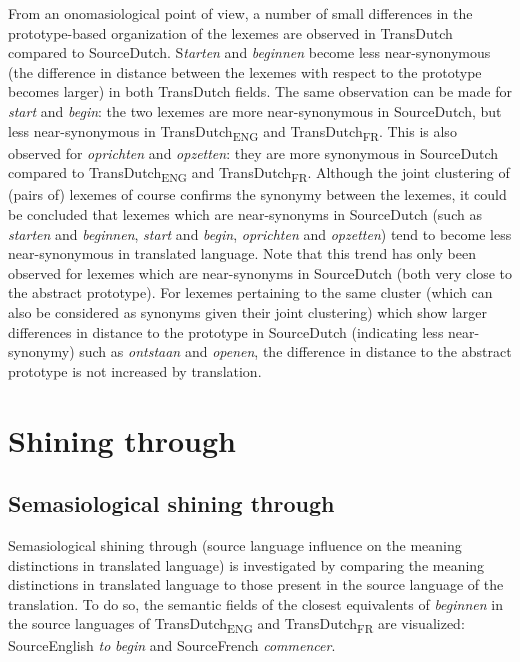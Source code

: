 From an onomasiological point of view, a number of small differences in the prototype-based organization of the lexemes are observed in TransDutch compared to SourceDutch. S\textit{tarten} and \textit{beginnen} become less near-synonymous (the difference in distance between the lexemes with respect to the prototype becomes larger) in both TransDutch fields. The same observation can be made for \textit{start} and \textit{begin}: the two lexemes are more near-synonymous in SourceDutch, but less near-synonymous in TransDutch\textsubscript{ENG} and TransDutch\textsubscript{FR}. This is also observed for \textit{oprichten} and \textit{opzetten}: they are more synonymous in SourceDutch compared to TransDutch\textsubscript{ENG} and TransDutch\textsubscript{FR}. Although the joint clustering of (pairs of) lexemes of course confirms the synonymy between the lexemes, it could be concluded that lexemes which are near-synonyms in SourceDutch (such as \textit{starten} and \textit{beginnen}, \textit{start} and \textit{begin}, \textit{oprichten} and \textit{opzetten}) tend to become less near-synonymous in translated language. Note that this trend has only been observed for lexemes which are near-synonyms in SourceDutch (both very close to the abstract prototype). For lexemes pertaining to the same cluster (which can also be considered as synonyms given their joint clustering) which show larger differences in distance to the prototype in SourceDutch (indicating less near-synonymy) such as \textit{ontstaan} and \textit{openen}, the difference in distance to the abstract prototype is not increased by translation.

\section{Shining through}
\label{sec:4.6}  
\subsection{Semasiological shining through}
\label{sec:4.6.1}  
Semasiological shining through (source language influence on the meaning distinctions in translated language) is investigated by comparing the meaning distinctions in translated language to those present in the source language of the translation. To do so, the semantic fields of the closest equivalents of \textit{beginnen} in the source languages of TransDutch\textsubscript{ENG} and TransDutch\textsubscript{FR} are visualized: SourceEnglish \textit{to} \textit{begin} and SourceFrench \textit{commencer}.

